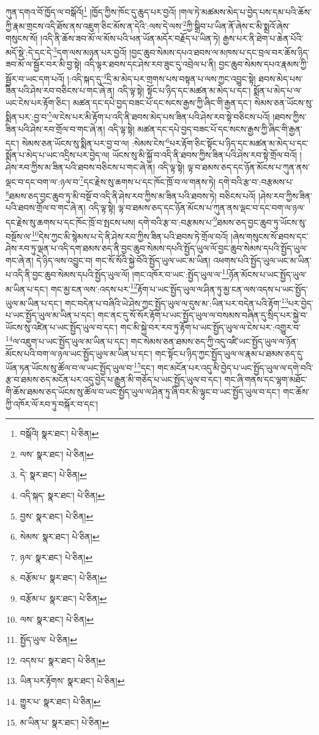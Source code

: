 ཀུན་དགའ་བོ་ཁྱོད་ལ་བསྒོའོ།\footnote{བསྒོའི།  སྣར་ཐང་།  པེ་ཅིན། } །ཁྱོད་ཀྱིས་ཁོང་དུ་ཆུད་པར་བྱའོ། །གལ་ཏེ་མཚམས་མེད་པ་བྱེད་པས་དམ་པའི་ཆོས་ཀྱི་རྣམ་གྲངས་འདི་ཐོས་ནས་འཇུག་ཅིང་མོས་ན་དེའི་:ལས་དེ་ལས་\footnote{ལས་  སྣར་ཐང་།  པེ་ཅིན། }ཀྱི་སྒྲིབ་པ་ཡིན་ནོ་ཞེས་ང་མི་སྨྲའོ་ཞེས་གསུངས་སོ། །འདི་ནི་ཆོས་ཟབ་མོ་ལ་མོས་པའི་ཕན་ཡོན་མདོར་བརྗོད་པ་ཡིན་ཏེ། རྒྱས་པར་ནི་ཐེག་པ་ཆེན་པོའི་མདོ་སྡེ་:དེ་དང་དེ་\footnote{དེ་  སྣར་ཐང་།  པེ་ཅིན། }དག་ལས་མཉན་པར་བྱའོ། །བྱང་ཆུབ་སེམས་དཔའ་ཐབས་ལ་མཁས་པ་དང་བྲལ་བར་ཆོས་ཉིད་ཟབ་མོ་ལ་སྦྱོར་བར་མི་བྱ་སྟེ། འདི་ལྟར་ཐབས་དང་ཤེས་རབ་ཟུང་དུ་འབྲེལ་པ་ནི། བྱང་ཆུབ་སེམས་དཔའ་རྣམས་ཀྱི་སྦྱོར་བ་ཡང་དག་པའོ། །:འདི་སྐད་དུ་\footnote{འདི་སྐད་  སྣར་ཐང་།  པེ་ཅིན། }དྲི་མ་མེད་པར་གྲགས་པས་བསྟན་པ་ལས་ཀྱང་འབྱུང་སྟེ། ཐབས་མེད་པས་ཟིན་པའི་ཤེས་རབ་བཅིངས་པ་གང་ཞེ་ན། འདི་ལྟ་སྟེ། སྟོང་པ་ཉིད་དང་མཚན་མ་མེད་པ་དང་། སྨོན་པ་མེད་པ་ལ་ཡང་ངེས་པར་རྟོག་ཅིང་། མཚན་དང་དཔེ་བྱད་བཟང་པོ་དང་སངས་རྒྱས་ཀྱི་ཞིང་གི་རྒྱན་དང་། སེམས་ཅན་ཡོངས་སུ་སྨིན་པར་:བྱ་བ་\footnote{བྱས་  སྣར་ཐང་།  པེ་ཅིན། }ལ་ངེས་པར་མི་རྟོག་པ་འདི་ནི་ཐབས་མེད་པས་ཟིན་པའི་ཤེས་རབ་སྟེ་བཅིངས་པའོ། །ཐབས་ཀྱིས་ཟིན་པའི་ཤེས་རབ་གྲོལ་བ་གང་ཞེ་ན། འདི་ལྟ་སྟེ། མཚན་དང་དཔེ་བྱད་བཟང་པོ་དང་སངས་རྒྱས་ཀྱི་ཞིང་གི་རྒྱན་དང་། སེམས་ཅན་ཡོངས་སུ་སྨིན་པར་བྱ་བ་ལ། :སེམས་ངེས་\footnote{སེམས་  སྣར་ཐང་།  པེ་ཅིན། }པར་རྟོག་ཅིང་སྟོང་པ་ཉིད་དང་མཚན་མ་མེད་པ་དང་སྨོན་པ་མེད་པ་ཡང་འདྲིས་པར་བྱེད་ལ། ཡོངས་སུ་མི་སྐྱོ་བ་འདི་ནི་ཐབས་ཀྱིས་ཟིན་པའི་ཤེས་རབ་སྟེ་གྲོལ་བའོ། །ཤེས་རབ་ཀྱིས་མ་ཟིན་པའི་ཐབས་བཅིངས་པ་གང་ཞེ་ན། འདི་ལྟ་སྟེ། ལྟ་བ་ཐམས་ཅད་དང་ཉོན་མོངས་པ་ཀུན་ནས་ལྡང་བ་དང་བག་ལ་:ཉལ་བ་\footnote{ཉལ་  སྣར་ཐང་།  པེ་ཅིན། }དང་རྗེས་སུ་ཆགས་པ་དང་ཁོང་ཁྲོ་བ་ལ་གནས་ཏེ། དགེ་བའི་རྩ་བ་:བརྩམས་པ་\footnote{བརྩོམ་པ་  སྣར་ཐང་།  པེ་ཅིན། }ཐམས་ཅད་བྱང་ཆུབ་ཏུ་མི་བསྔོ་བ་འདི་ནི་ཤེས་རབ་ཀྱིས་མ་ཟིན་པའི་ཐབས་ཏེ། བཅིངས་པའོ། །ཤེས་རབ་ཀྱིས་ཟིན་པའི་ཐབས་གྲོལ་བ་གང་ཞེ་ན། འདི་ལྟ་སྟེ། ལྟ་བ་ཐམས་ཅད་དང་ཉོན་མོངས་པ་ཀུན་ནས་ལྡང་བ་དང་བག་ལ་ཉལ་དང་རྗེས་སུ་ཆགས་པ་དང་ཁོང་ཁྲོ་བ་སྤངས་པས། དགེ་བའི་རྩ་བ་:བརྩམས་པ་\footnote{བརྩོམ་པ་  སྣར་ཐང་།  པེ་ཅིན། }ཐམས་ཅད་བྱང་ཆུབ་ཏུ་ཡོངས་སུ་བསྔོས་ལ་\footnote{ལས་  སྣར་ཐང་།  པེ་ཅིན། }དེས་ཀྱང་མི་སྙེམས་པ་དེ་ནི་ཤེས་རབ་ཀྱིས་ཟིན་པའི་ཐབས་ཏེ་གྲོལ་བའོ། །ཞེས་གསུངས་སོ་ཐབས་དང་ཤེས་རབ་ཏུ་ལྡན་པ་འདི་དག་ཐམས་ཅད་ནི་བྱང་ཆུབ་སེམས་དཔའི་སྤྱོད་ཡུལ་ལོ་བྱང་ཆུབ་སེམས་དཔའི་སྤྱོད་ཡུལ་གང་ཞེ་ན། དེ་ཉིད་ལས་འབྱུང་བ། གང་སོ་སོའི་སྐྱེ་བོའི་སྤྱོད་ཡུལ་ཡང་མ་ཡིན། འཕགས་པའི་སྤྱོད་ཡུལ་ཡང་མ་ཡིན་པ་འདི་ནི་བྱང་ཆུབ་སེམས་དཔའི་སྤྱོད་ཡུལ་ལོ། །གང་འཁོར་བ་ཡང་:སྤྱོད་ཡུལ་ལ་\footnote{སྤྱོད་ཡུལ་  པེ་ཅིན། }ཉོན་མོངས་པ་ཡང་སྤྱོད་ཡུལ་མ་ཡིན་པ་དང་། གང་མྱ་ངན་ལས་:འདས་པར་\footnote{འདས་པ་  སྣར་ཐང་།  པེ་ཅིན། }རྟོག་པ་ཡང་སྤྱོད་ཡུལ་ལ་ཤིན་ཏུ་མྱ་ངན་ལས་འདས་པ་ཡང་སྤྱོད་ཡུལ་མ་ཡིན་པ་དང་། གང་བདེན་པ་བཞིའི་ཡེ་ཤེས་ཀྱང་སྤྱོད་ཡུལ་ལ་དུས་མ་:ཡིན་པར་བདེན་པའི་རྟོག་\footnote{ཡིན་པར་རྟོགས་  སྣར་ཐང་།  པེ་ཅིན། }པར་བྱེད་པ་ཡང་སྤྱོད་ཡུལ་མ་ཡིན་པ་དང་། གང་ནང་དུ་སོ་སོར་རྟོག་པ་ཡང་སྤྱོད་ཡུལ་ལ་བསམས་བཞིན་དུ་སྲིད་པར་སྐྱེ་བ་ཡོངས་སུ་འཛིན་པ་ཡང་སྤྱོད་ཡུལ་བ་དང་། གང་མི་སྐྱེ་བར་རབ་ཏུ་རྟོག་པ་ཡང་སྤྱོད་ཡུལ་ལ་ངེས་པར་:འགྱུར་བ་\footnote{གྱུར་པ་  སྣར་ཐང་།  པེ་ཅིན། }ལ་འཇུག་པ་ཡང་སྤྱོད་ཡུལ་མ་ཡིན་པ་དང་། གང་སེམས་ཅན་ཐམས་ཅད་ཀྱི་འདུ་འཛི་ཡང་སྤྱོད་ཡུལ་ལ་ཉོན་མོངས་པའི་བག་ལ་ཉལ་ཡང་སྤྱོད་ཡུལ་མ་ཡིན་པ་དང་། གང་སྟོང་པ་ཉིད་ཀྱང་སྤྱོད་ཡུལ་ལ་རྣམ་པ་ཐམས་ཅད་དུ་ཡོན་ཏན་ཡོངས་སུ་ཚོལ་བ་ལ་ཡང་སྤྱོད་ཡུལ་བ་\footnote{མ་ཡིན་པ་  སྣར་ཐང་།  པེ་ཅིན། }དང་། གང་མངོན་པར་འདུ་མི་བྱེད་པ་ཡང་སྤྱོད་ཡུལ་ལ་དགེ་བའི་རྩ་བ་ཐམས་ཅད་མངོན་པར་འདུ་བྱེད་པ་རྒྱུན་མི་གཅོད་པ་ཡང་སྤྱོད་ཡུལ་བ་དང་། གང་ཞི་གནས་དང་ལྷག་མཐོང་གི་ཆོས་ཐམས་ཅད་ཡོངས་སུ་ཚོལ་བ་ཡང་སྤྱོད་ཡུལ་ལ་ཤིན་ཏུ་ཞི་བར་མི་ལྟུང་བ་ཡང་སྤྱོད་ཡུལ་བ་དང་། གང་ཆོས་ཀྱི་འཁོར་ལོ་རབ་ཏུ་བསྐོར་བ་དང་། 